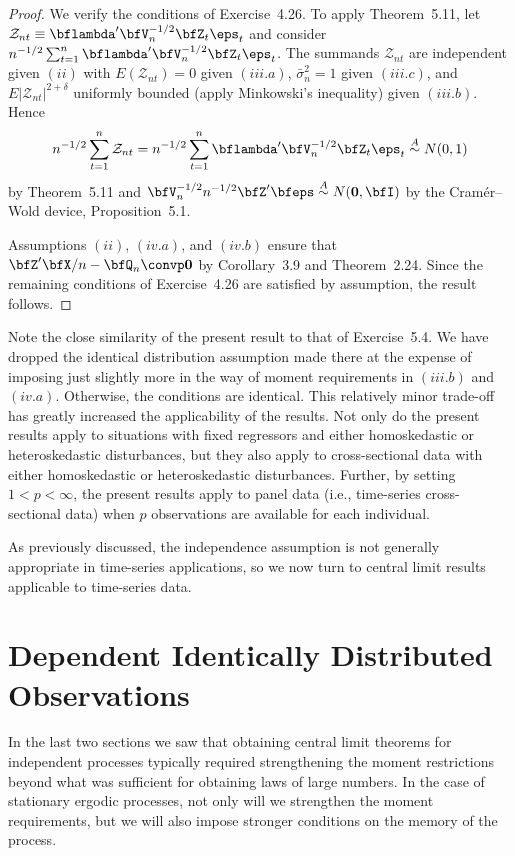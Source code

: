 \begin{proof}
We verify the conditions of Exercise~4.26. To apply Theorem~5.11, let $\mathcal{Z}_{nt} \equiv \bflambda'\bfV_n^{-1/2}\bfZ_t\eps_t$ and consider $n^{-1/2}\sum_{t=1}^{n}\bflambda'\bfV_n^{-1/2}\bfZ_t\eps_t$. The summands $\mathcal{Z}_{nt}$ are independent given $(ii)$ with $E(\mathcal{Z}_{nt}) = 0$ given $(iii.a)$, $\bar{\sigma}_n^2 = 1$ given $(iii.c)$, and $E|\mathcal{Z}_{nt}|^{2+\delta}$ uniformly bounded (apply Minkowski's inequality) given $(iii.b)$. Hence
\[
n^{-1/2}\sum_{t=1}^{n}\mathcal{Z}_{nt} = n^{-1/2}\sum_{t=1}^{n}\bflambda'\bfV_n^{-1/2}\bfZ_t\eps_t \overset{A}{\sim} N(0,1)
\]
by Theorem~5.11 and $\bfV_n^{-1/2}n^{-1/2}\bfZ'\bfeps \overset{A}{\sim} N(\mathbf{0}, \bfI)$ by the Cram\'{e}r--Wold device, Proposition~5.1.

Assumptions $(ii)$, $(iv.a)$, and $(iv.b)$ ensure that $\bfZ'\bfX/n - \bfQ_n \convp \mathbf{0}$ by Corollary~3.9 and Theorem~2.24. Since the remaining conditions of Exercise~4.26 are satisfied by assumption, the result follows.
\end{proof}

Note the close similarity of the present result to that of Exercise~5.4. We have dropped the identical distribution assumption made there at the expense of imposing just slightly more in the way of moment requirements in $(iii.b)$ and $(iv.a)$. Otherwise, the conditions are identical. This relatively minor trade-off has greatly increased the applicability of the results. Not only do the present results apply to situations with fixed regressors and either homoskedastic or heteroskedastic disturbances, but they also apply to cross-sectional data with either homoskedastic or heteroskedastic disturbances. Further, by setting $1 < p < \infty$, the present results apply to panel data (i.e., time-series cross-sectional data) when $p$ observations are available for each individual.

As previously discussed, the independence assumption is not generally appropriate in time-series applications, so we now turn to central limit results applicable to time-series data.

\section{Dependent Identically Distributed Observations}\label{sec:clt-did}

In the last two sections we saw that obtaining central limit theorems for independent processes typically required strengthening the moment restrictions beyond what was sufficient for obtaining laws of large numbers. In the case of stationary ergodic processes, not only will we strengthen the moment requirements, but we will also impose stronger conditions on the memory of the process.

